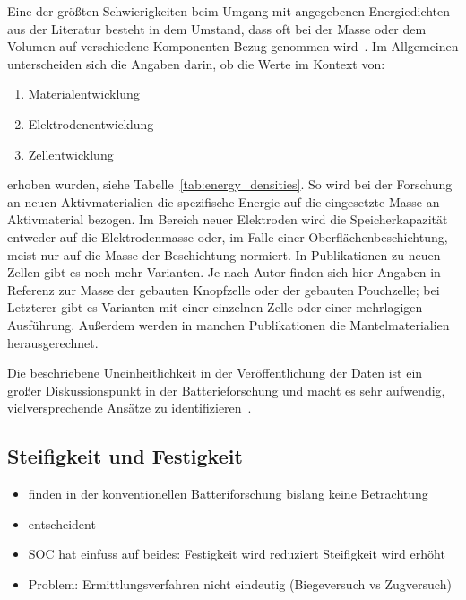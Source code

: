 Eine der größten Schwierigkeiten beim Umgang mit angegebenen Energiedichten aus der Literatur besteht in dem Umstand, dass oft bei der Masse oder dem Volumen auf verschiedene Komponenten Bezug genommen wird~\cite{Son2021}. Im Allgemeinen unterscheiden sich die Angaben darin, ob die Werte im Kontext von:
\begin{enumerate}
	\item Materialentwicklung
	\item Elektrodenentwicklung
	\item Zellentwicklung
\end{enumerate}
erhoben wurden, siehe Tabelle~\ref{tab:energy_densities}.
So wird bei der Forschung an neuen Aktivmaterialien die spezifische Energie auf die eingesetzte Masse an Aktivmaterial bezogen. Im Bereich neuer Elektroden wird die Speicherkapazität entweder auf die Elektrodenmasse oder, im Falle einer Oberflächenbeschichtung, meist nur auf die Masse der Beschichtung normiert. In Publikationen zu neuen Zellen gibt es noch mehr Varianten. Je nach Autor finden sich hier Angaben in Referenz zur Masse der gebauten Knopfzelle oder der gebauten Pouchzelle; bei Letzterer gibt es Varianten mit einer einzelnen Zelle oder einer mehrlagigen Ausführung. Außerdem werden in manchen Publikationen die Mantelmaterialien herausgerechnet.

Die beschriebene Uneinheitlichkeit in der Veröffentlichung der Daten ist ein großer Diskussionspunkt in der Batterieforschung und macht es sehr aufwendig, vielversprechende Ansätze zu identifizieren~\cite{Greenhalgh2023, Zschiebsch2024}.

\subsection{Steifigkeit und Festigkeit}
\begin{itemize}
	\item finden in der konventionellen Batteriforschung bislang keine Betrachtung
	\item entscheident
	\item SOC hat einfuss auf beides: Festigkeit wird reduziert Steifigkeit wird erhöht
	\item Problem: Ermittlungsverfahren nicht eindeutig (Biegeversuch vs Zugversuch)
\end{itemize}
